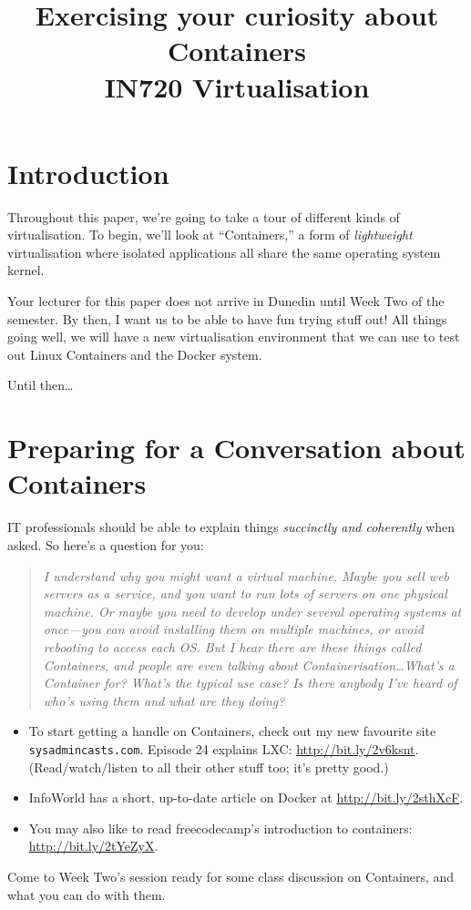 \documentclass{article}
\begin{document}
\title{Exercising your curiosity about Containers\\ IN720 Virtualisation}
\date{}
\maketitle

\section*{Introduction}
Throughout this paper, we're going to take a tour of different kinds of virtualisation.  To begin, we'll look at ``Containers,'' a form of {\em lightweight} virtualisation where isolated applications all share the same operating system kernel.

Your lecturer for this paper does not arrive in Dunedin until Week Two of the semester.  By then, I want us to be able to have fun trying stuff out!  All things going well, we will have a new virtualisation environment that we can use to test out Linux Containers and the Docker system.

Until then\ldots

\section*{Preparing for a Conversation about Containers}

IT professionals should be able to explain things {\em succinctly and coherently} when asked.  So here's a question for you:
\begin{quote}
{\em I understand why you might want a virtual machine.  Maybe you sell web servers as a service, and you want to run lots of servers on one physical machine.  Or maybe you need to develop under several operating systems at once---you can avoid installing them on multiple machines, or avoid rebooting to access each OS.  But I hear there are these things called Containers, and people are even talking about Containerisation\ldots What's a Container for? What's the typical use case? Is there anybody I've heard of who's using them and what are they doing?}
\end{quote}

\begin{itemize}
\item To start getting a handle on Containers, check out my new favourite site {\tt sysadmincasts.com}.
Episode 24 explains LXC: \url{http://bit.ly/2v6ksnt}. (Read/watch/listen to all their other stuff too; it's pretty good.)

\item InfoWorld has a short, up-to-date article on Docker at \url{http://bit.ly/2sthXcF}.

\item You may also like to read freecodecamp's introduction to containers: 
\url{http://bit.ly/2tYeZyX}.
\end{itemize}

Come to Week Two's session ready for some class discussion on Containers, and what you can do with them.
\end{document}
